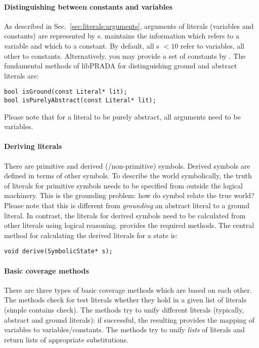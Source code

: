 \documentclass[10pt,twoside,twocolumn,fleqn]{article}
\begin{document}
\paragraph{Distinguishing between constants and variables}

As described in Sec.~\ref{sec:literals:arguments}, arguments of literals
(variables and constants) are represented by s. 
maintains the information which  refers to a variable and which
to a constant. By default, all s $<10$ refer to variables, all
other to constants. Alternatively, you may provide a set of constants by
. The fundamental methods of
libPRADA for distinguishing ground and abstract literals are:
\begin{lstlisting}
bool isGround(const Literal* lit);
bool isPurelyAbstract(const Literal* lit);
\end{lstlisting}
Please note that for a literal to be purely abstract, all arguments need
to be variables.

\paragraph{Deriving literals}

There are primitive and derived (/non-primitive) symbols. Derived symbols
are defined in terms of other symbols. To describe the world
symbolically, the truth of literals for primitive symbols needs to be
specified from outside the logical machinery. This is the grounding
problem: how do symbol relate the true world? Please note that this is
different from \emph{grounding} an abstract literal to a ground literal.
In contrast, the literals for derived symbols need to be calculated from
other literals using logical reasoning.  provides the
required methods. The central method for calculating the derived
literals for a state is:
\begin{lstlisting}
void derive(SymbolicState* s);
\end{lstlisting}


\paragraph{Basic coverage methods}

There are three types of basic coverage methods which are based on each
other. The  methods check for test literals whether they hold
in a given list of literals (simple contains check). The 
methods try to unify different literals (typically, abstract and ground
literals): if successful, the resulting  provides the
mapping of variables to variables/constants. The  methods try
to unify \emph{lists} of literals and return lists of appropriate
substitutions.
\end{document}
